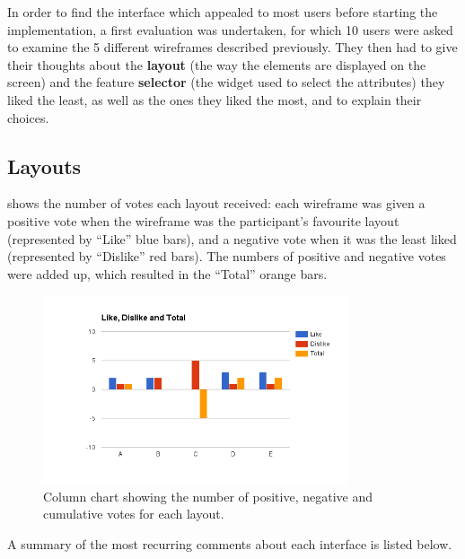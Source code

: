\documentclass{mproj}
\begin{document}
In order to find the interface which appealed to most users before starting the implementation, a first evaluation was undertaken, for which 10 users were asked to examine the 5 different wireframes described previously. They then had to give their thoughts about the \textbf{layout} (the way the elements are displayed on the screen) and the feature \textbf{selector} (the widget used to select the attributes) they liked the least, as well as the ones they liked the most, and to explain their choices.

\subsection*{Layouts}

 shows the number of votes each layout received: each wireframe was given a positive vote when the wireframe was the participant's favourite layout (represented by ``Like'' blue bars), and a negative vote when it was the least liked (represented by ``Dislike'' red bars). The numbers of positive and negative votes were added up, which resulted in the ``Total'' orange bars. 

\begin{figure}[h]
	\centering
	\includegraphics[width=0.8\textwidth]{images/layout_feedback}
	\caption{Column chart showing the number of positive, negative and cumulative votes for each layout.}
	\label{fig:layout_feedback}
\end{figure}

A summary of the most recurring comments about each interface is listed below.
\end{document}
